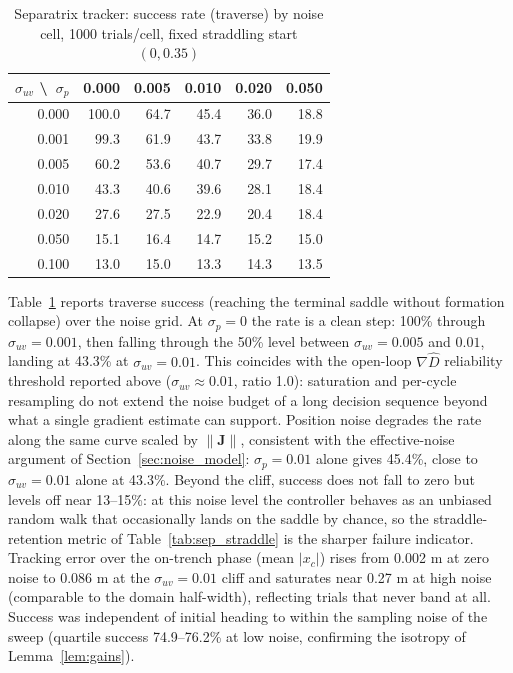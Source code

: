 \documentclass[lettersize,journal]{IEEEtran}
\begin{document}
\begin{table}[!t]
\centering
\caption{Separatrix tracker: success rate (traverse) by noise cell,
1000 trials/cell, fixed straddling start $(0, 0.35)$}
\label{tab:sep_success}
\footnotesize
\setlength{\tabcolsep}{4pt}
\begin{tabular}{r|rrrrr}
\hline
$\sigma_{uv}$ \textbackslash\ $\sigma_p$ & 0.000 & 0.005 & 0.010 & 0.020 & 0.050 \\
\hline
0.000 & 100.0 & 64.7 & 45.4 & 36.0 & 18.8 \\
0.001 &  99.3 & 61.9 & 43.7 & 33.8 & 19.9 \\
0.005 &  60.2 & 53.6 & 40.7 & 29.7 & 17.4 \\
0.010 &  43.3 & 40.6 & 39.6 & 28.1 & 18.4 \\
0.020 &  27.6 & 27.5 & 22.9 & 20.4 & 18.4 \\
0.050 &  15.1 & 16.4 & 14.7 & 15.2 & 15.0 \\
0.100 &  13.0 & 15.0 & 13.3 & 14.3 & 13.5 \\
\hline
\end{tabular}
\end{table}

Table~\ref{tab:sep_success} reports traverse success (reaching the
terminal saddle without formation collapse) over the noise grid. At
$\sigma_p = 0$ the rate is a clean step: 100\% through
$\sigma_{uv} = 0.001$, then falling through the 50\% level between
$\sigma_{uv} = 0.005$ and $0.01$, landing at 43.3\% at
$\sigma_{uv} = 0.01$. This coincides with the open-loop
$\nabla\hat{D}$ reliability threshold reported above
($\sigma_{uv} \approx 0.01$, ratio 1.0): saturation and per-cycle
resampling do not extend the noise budget
of a long decision sequence beyond what a single gradient estimate can
support. Position noise degrades the rate along the same curve scaled
by $\|\mathbf{J}\|$, consistent with the effective-noise argument of
Section~\ref{sec:noise_model}: $\sigma_p = 0.01$ alone gives 45.4\%,
close to $\sigma_{uv} = 0.01$ alone at 43.3\%. Beyond the cliff, success
does not fall to zero but levels off near 13--15\%: at this noise level
the controller behaves as an unbiased random walk that occasionally
lands on the saddle by chance, so the straddle-retention metric of
Table~\ref{tab:sep_straddle} is the sharper failure indicator. Tracking
error over the on-trench phase (mean $|x_c|$) rises from 0.002 m at zero
noise to 0.086 m at the $\sigma_{uv} = 0.01$ cliff and saturates near
0.27 m at high noise (comparable to the domain half-width), reflecting
trials that never band at all. Success was independent of initial
heading to within the sampling noise of the sweep (quartile success
74.9--76.2\% at low noise, confirming the isotropy of
Lemma~\ref{lem:gains}).
\end{document}
